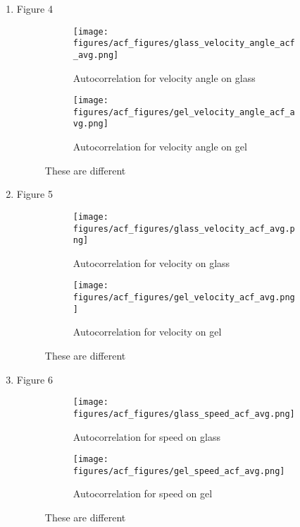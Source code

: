 \documentclass[12pt]{article}
\begin{document}
\begin{enumerate}
\item Figure 4
\begin{figure}[h!]
    \centering
    \begin{subfigure}[b]{0.4\linewidth}
      \texttt{[image: figures/acf\_figures/glass\_velocity\_angle\_acf\_avg.png]}
      \caption{Autocorrelation for velocity angle on glass}
    \end{subfigure}
    \begin{subfigure}[b]{0.4\linewidth}
      \texttt{[image: figures/acf\_figures/gel\_velocity\_angle\_acf\_avg.png]}
      \caption{Autocorrelation for velocity angle on gel}
    \end{subfigure}
    \caption{These are different}
    \label{fig:acf_velang}
  \end{figure}

\item Figure 5
\begin{figure}[h!]
    \centering
    \begin{subfigure}[b]{0.4\linewidth}
      \texttt{[image: figures/acf\_figures/glass\_velocity\_acf\_avg.png]}
      \caption{Autocorrelation for velocity on glass}
    \end{subfigure}
    \begin{subfigure}[b]{0.4\linewidth}
      \texttt{[image: figures/acf\_figures/gel\_velocity\_acf\_avg.png]}
      \caption{Autocorrelation for velocity on gel}
    \end{subfigure}
    \caption{These are different}
    \label{fig:acf_vel}
  \end{figure}

\item Figure 6
\begin{figure}[h!]
    \centering
    \begin{subfigure}[b]{0.4\linewidth}
      \texttt{[image: figures/acf\_figures/glass\_speed\_acf\_avg.png]}
      \caption{Autocorrelation for speed on glass}
    \end{subfigure}
    \begin{subfigure}[b]{0.4\linewidth}
      \texttt{[image: figures/acf\_figures/gel\_speed\_acf\_avg.png]}
      \caption{Autocorrelation for speed on gel}
    \end{subfigure}
    \caption{These are different}
    \label{fig:acf_speed}
  \end{figure}


\end{enumerate}
\end{document}
